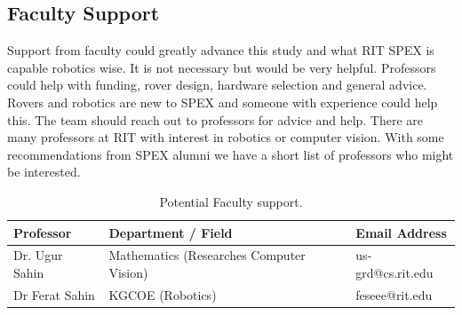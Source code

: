 \documentclass[conference]{IEEEtran} %
\begin{document}
\subsection{Faculty Support}
Support from faculty could greatly advance this study and what RIT SPEX is capable robotics wise. It is not necessary but would be very helpful. Professors could help with funding, rover design, hardware selection and general advice. Rovers and robotics are new to SPEX and someone with experience could help this. The team should reach out to professors for advice and help. There are many professors at RIT with interest in robotics or computer vision. With some recommendations from SPEX alumni we have a short list of professors who might be interested. 


\begin{table}[hb!]
    \caption{Potential Faculty support.}
    \centering
    {\renewcommand{\arraystretch}{1.2}
    \begin{tabularx}{\linewidth}{LLL} 
    \hline
    \textbf{Professor} & \textbf{Department / Field} & \textbf{Email Address} \\
    \hline
    Dr. Ugur Sahin & Mathematics (Researches Computer Vision) & us-grd@cs.rit.edu \\
    \hline
    Dr Ferat Sahin & KGCOE (Robotics) & feseee@rit.edu \\
    \hline
    \end{tabularx}
    }
\label{tab:fac-sup}
\end{table}
\end{document}
